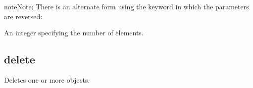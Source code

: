 \documentclass[letterpaper,12pt,english,openany,oneside]{sphinxmanual}
\begin{document}
\begin{sphinxadmonition}{note}{Note:}
There is an alternate form using the keyword  in which the parameters are reversed:
\end{sphinxadmonition}

\begin{sphinxVerbatim}[commandchars=\\\{\}]
\PYG{p}{[}\PYG{p}{]} 
\PYG{p}{[} \PYG{p}{]}
\end{sphinxVerbatim}


An integer specifying the number of elements.


\begin{sphinxVerbatim}[commandchars=\\\{\}]
    
     
    
\end{sphinxVerbatim}




\subsection{delete}
\label{\detokenize{IAC_API_AppleEvtObjects:delete}}
Deletes one or more objects.

\label{\detokenize{IAC_API_AppleEvtObjects:syntax-4}}

\begin{sphinxVerbatim}[commandchars=\\\{\}]
 \PYG{p}{[}\PYG{p}{]}
\end{sphinxVerbatim}
\label{\detokenize{IAC_API_AppleEvtObjects:parameters-4}}
\end{document}
